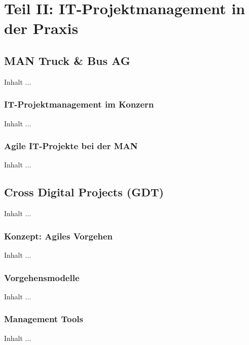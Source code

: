 
\chapter{Teil II: IT-Projektmanagement in der Praxis}
\minitoc 
\vspace{1 cm} 

\section{MAN Truck \& Bus AG}
Inhalt ...

\subsection{IT-Projektmanagement im Konzern}
Inhalt ...

\subsection{Agile IT-Projekte bei der MAN}
Inhalt ...


\section{Cross Digital Projects (GDT)}
Inhalt ...

\subsection{Konzept: Agiles Vorgehen}
Inhalt ...

\subsection{Vorgehensmodelle}
Inhalt ...

\subsection{Management Tools}
Inhalt ...
